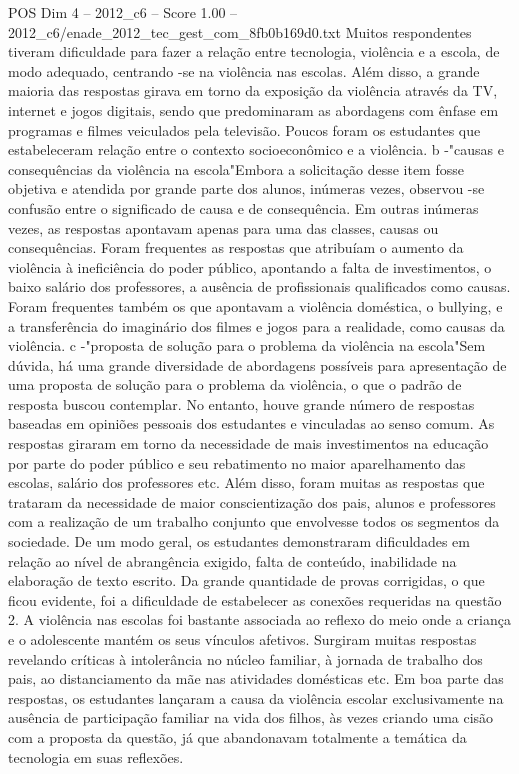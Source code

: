 \begin{textsample}{POS Dim 4 – 2012\_c6 – Score 1.00 – 2012\_c6/enade\_2012\_tec\_gest\_com\_8fb0b169d0.txt}
Muitos respondentes tiveram dificuldade para fazer a relação entre tecnologia, violência e a escola, de modo adequado, centrando -se na violência nas escolas.
Além disso, a grande maioria das respostas girava em torno da exposição da violência através da TV, internet e jogos digitais, sendo que predominaram as abordagens com ênfase em programas e filmes veiculados pela televisão.
Poucos foram os estudantes que estabeleceram relação entre o contexto socioeconômico e a violência. b -"causas e consequências da violência na escola"Embora a solicitação desse item fosse objetiva e atendida por grande parte dos alunos, inúmeras vezes, observou -se confusão entre o significado de causa e de consequência.
Em outras inúmeras vezes, as respostas apontavam apenas para uma das classes, causas ou consequências.
Foram frequentes as respostas que atribuíam o aumento da violência à ineficiência do poder público, apontando a falta de investimentos, o baixo salário dos professores, a ausência de profissionais qualificados como causas.
Foram frequentes também os que apontavam a violência doméstica, o bullying, e a transferência do imaginário dos filmes e jogos para a realidade, como causas da violência. c -"proposta de solução para o problema da violência na escola"Sem dúvida, há uma grande diversidade de abordagens possíveis para apresentação de uma proposta de solução para o problema da violência, o que o padrão de resposta buscou contemplar.
No entanto, houve grande número de respostas baseadas em opiniões pessoais dos estudantes e vinculadas ao senso comum.
As respostas giraram em torno da necessidade de mais investimentos na educação por parte do poder público e seu rebatimento no maior aparelhamento das escolas, salário dos professores etc.
Além disso, foram muitas as respostas que trataram da necessidade de maior conscientização dos pais, alunos e professores com a realização de um trabalho conjunto que envolvesse todos os segmentos da sociedade.
De um modo geral, os estudantes demonstraram dificuldades em relação ao nível de abrangência exigido, falta de conteúdo, inabilidade na elaboração de texto escrito.
Da grande quantidade de provas corrigidas, o que ficou evidente, foi a dificuldade de estabelecer as conexões requeridas na questão 2.
A violência nas escolas foi bastante associada ao reflexo do meio onde a criança e o adolescente mantém os seus vínculos afetivos.
Surgiram muitas respostas revelando críticas à intolerância no núcleo familiar, à jornada de trabalho dos pais, ao distanciamento da mãe nas atividades domésticas etc.
Em boa parte das respostas, os estudantes lançaram a causa da violência escolar exclusivamente na ausência de participação familiar na vida dos filhos, às vezes criando uma cisão com a proposta da questão, já que abandonavam totalmente a temática da tecnologia em suas reflexões.

\end{textsample}
